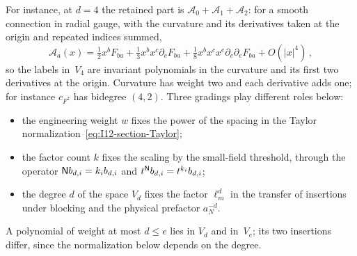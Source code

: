 For instance, at $d=4$ the retained part is $\mathcal A_0+\mathcal A_1+\mathcal A_2$: for a smooth connection in radial gauge, with the curvature and its derivatives taken at the origin and repeated indices summed,
\begin{equation*}
\mathcal A_a(x)=\tfrac12x^bF_{ba}+\tfrac13x^bx^c\partial_cF_{ba}+\tfrac18x^bx^cx^e\partial_c\partial_eF_{ba}+O(|x|^4)\,,
\end{equation*}
so the labels in~$V_4$ are invariant polynomials in the curvature and its first two derivatives at the origin. Curvature has weight two and each derivative adds one; for instance $c_{F^2}$ has bidegree $(4,2)$. Three gradings play different roles below:
\begin{itemize}[nosep]
\item the engineering weight $w$ fixes the power of the spacing in the Taylor normalization~\eqref{eq:I12-section-Taylor};
\item the factor count $k$ fixes the scaling by the small-field threshold, through the operator $\mathsf{N} b_{d,i}=k_ib_{d,i}$ and $t^{\mathsf{N}}b_{d,i}=t^{k_i}b_{d,i}$;
\item the degree $d$ of the space $V_d$ fixes the factor $\ell_m^d$ in the transfer of insertions under blocking and the physical prefactor $a_N^{-d}$.
\end{itemize}
A polynomial of weight at most $d\le e$ lies in $V_d$ and in~$V_e$; its two insertions differ, since the normalization below depends on the degree.

